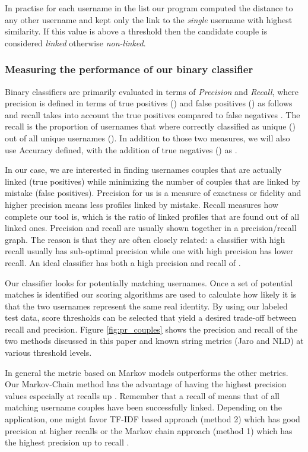 \documentclass[letterpaper]{sig-alternate}
\begin{document}
In practise for each username in the list our program computed the
distance to any other username and kept only the link to the {\em single}
username with highest similarity.
If this value is above a threshold then the candidate couple is considered
{\em linked} otherwise {\em non-linked}.

\subsubsection{Measuring the performance of our binary classifier}


Binary classifiers are primarily evaluated in terms of {\em Precision} and {\em
Recall}, where precision is defined in terms of true positives () and false
positives () as follows  and recall takes
into account the true positives compared to false negatives .  The recall is the proportion of usernames that
where correctly classified as unique () out of all unique usernames
().  In addition to those two measures, we will also use Accuracy
defined, with the addition of true negatives () as .

In our case, we are interested in finding usernames couples that are actually linked
(true positives) while minimizing the number of couples that are linked by
mistake (false positives).  Precision for us is a measure of exactness or
fidelity and higher precision means less profiles linked by mistake.  Recall
measures how complete our tool is, which is the ratio of linked profiles
that are found out of all linked ones.
Precision and recall are usually shown together in a precision/recall graph.
The reason is that they are often closely related: a classifier with high
recall usually has sub-optimal precision while one with high precision has lower
recall. An ideal classifier has both a high precision and recall of .

Our classifier looks for potentially matching usernames.
Once a set of potential matches is identified our scoring algorithms are used
to calculate how likely it is that the two usernames represent the same real identity.
By using
our labeled test data, score thresholds can be selected that yield a desired
trade-off between recall and precision. 
Figure \ref{fig:pr_couples} shows the precision and recall of the two methods
discussed in this paper and known string metrics (Jaro and NLD) at various threshold levels.

In general the metric based on Markov models outperforms the other metrics.
Our Markov-Chain method has the advantage of having the highest precision values
especially at recalls up . Remember that a recall of  means that  of all matching
username couples have been successfully linked.
Depending on the application, one might favor TF-IDF based approach (method 2) which has good precision
at higher recalls or the Markov chain approach (method 1) which has the highest precision up to recall .
\end{document}
